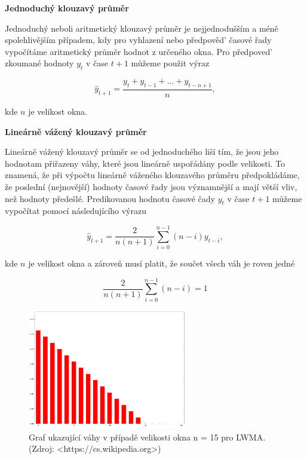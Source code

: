 \documentclass[a4paper,12pt,twoside]{scrreprt}
\begin{document}
\normalsize \textbf{Jednoduchý klouzavý průměr}

Jednoduchý neboli aritmetický klouzavý průměr je nejjednodušším a méně spolehlivějším případem, kdy pro vyhlazení nebo předpověd' časové řady vypočítáme aritmetický průměr hodnot z určeného okna. Pro předpoved' zkoumané hodnoty $y_t$ v čase $t+1$ můžeme použit výraz

\begin{equation}
\hat{y}_{t+1} = \frac{y_t + y_{t-1} + ... + y_{t-n+1}}{n},
\end{equation}

kde $n$ je velikost okna. 

\normalsize \textbf{Lineárně vážený klouzavý průměr}

Lineárně vážený klouzavý průměr se od jednoduchého liší tím, že jsou jeho hodnotam přiřazeny váhy, které jsou lineárně uspořádány podle velikosti. To znamená, že při výpočtu lineárně váženého klouzavého průměru předpokládáme, že poslední (nejnovější) hodnoty časové řady jsou významnější  a mají větší vliv, než hodnoty předešlé. Predikovanou hodnotu časové čady $y_t$ v čase $t+1$ můžeme vypočítat pomocí následujícího výrazu

\begin{equation}
\hat{y}_{t+1} = \frac{2}{n(n+1)}\sum_{i=0}^{n-1}(n-i)y_{t-i},
\end{equation}

kde $n$ je velikost okna a zároveň musí platit, že součet všech váh je roven jedné

\begin{equation}
\frac{2}{n(n+1)}\sum_{i=0}^{n-1}(n-i) = 1
\end{equation}

\begin{figure}[h]
  \centering
  \includegraphics[width=7cm]{pictures/linearMAweights.png}
  \caption{Graf ukazující váhy v případě velikosti okna n = 15 pro LWMA. \newline(Zdroj: <https://cs.wikipedia.org>)}
  \label{fig:linearWeights}
\end{figure}
\end{document}
